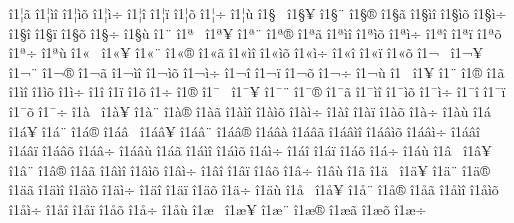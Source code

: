 {^^ee1^^a6^^e3
^^ee1^^a6^^ec^^ee
^^ee1^^a6^^ec^^f5
^^ee1^^a6^^ec^^f7
^^ee1^^a6^^ee
^^ee1^^a6^^ef
^^ee1^^a6^^f5
^^ee1^^a6^^f7
^^ee1^^a6^^f9
^^ee1^^a7^^a0
^^ee1^^a7^^a5
^^ee1^^a7^^a8
^^ee1^^a7^^ae
^^ee1^^a7^^e3
^^ee1^^a7^^ec^^ee
^^ee1^^a7^^ec^^f5
^^ee1^^a7^^ec^^f7
^^ee1^^a7^^ee
^^ee1^^a7^^ef
^^ee1^^a7^^f5
^^ee1^^a7^^f7
^^ee1^^a7^^f9
^^ee1^^a8
^^ee1^^aa^^a0
^^ee1^^aa^^a5
^^ee1^^aa^^a8
^^ee1^^aa^^ae
^^ee1^^aa^^e3
^^ee1^^aa^^ec^^ee
^^ee1^^aa^^ec^^f5
^^ee1^^aa^^ec^^f7
^^ee1^^aa^^ee
^^ee1^^aa^^ef
^^ee1^^aa^^f5
^^ee1^^aa^^f7
^^ee1^^aa^^f9
^^ee1^^ab^^a0
^^ee1^^ab^^a5
^^ee1^^ab^^a8
^^ee1^^ab^^ae
^^ee1^^ab^^e3
^^ee1^^ab^^ec^^ee
^^ee1^^ab^^ec^^f5
^^ee1^^ab^^ec^^f7
^^ee1^^ab^^ee
^^ee1^^ab^^ef
^^ee1^^ab^^f5
^^ee1^^ac^^a0
^^ee1^^ac^^a5
^^ee1^^ac^^a8
^^ee1^^ac^^ae
^^ee1^^ac^^e3
^^ee1^^ac^^ec^^ee
^^ee1^^ac^^ec^^f5
^^ee1^^ac^^ec^^f7
^^ee1^^ac^^ee
^^ee1^^ac^^ef
^^ee1^^ac^^f5
^^ee1^^ac^^f7
^^ee1^^ac^^f9
^^ee1^^ad^^a0
^^ee1^^ad^^a5
^^ee1^^ad^^a8
^^ee1^^ad^^ae
^^ee1^^ad^^e3
^^ee1^^ad^^ec^^ee
^^ee1^^ad^^ec^^f5
^^ee1^^ad^^ec^^f7
^^ee1^^ad^^ee
^^ee1^^ad^^ef
^^ee1^^ad^^f5
^^ee1^^ad^^f7
^^ee1^^ae
^^ee1^^af^^a0
^^ee1^^af^^a5
^^ee1^^af^^a8
^^ee1^^af^^ae
^^ee1^^af^^e3
^^ee1^^af^^ec^^ee
^^ee1^^af^^ec^^f5
^^ee1^^af^^ec^^f7
^^ee1^^af^^ee
^^ee1^^af^^ef
^^ee1^^af^^f5
^^ee1^^af^^f7
^^ee1^^e0^^a0
^^ee1^^e0^^a5
^^ee1^^e0^^a8
^^ee1^^e0^^ae
^^ee1^^e0^^e3
^^ee1^^e0^^ec^^ee
^^ee1^^e0^^ec^^f5
^^ee1^^e0^^ec^^f7
^^ee1^^e0^^ee
^^ee1^^e0^^ef
^^ee1^^e0^^f5
^^ee1^^e0^^f7
^^ee1^^e0^^f9
^^ee1^^e1^^a0
^^ee1^^e1^^a5
^^ee1^^e1^^a8
^^ee1^^e1^^ae
^^ee1^^e1^^e2^^a0
^^ee1^^e1^^e2^^a5
^^ee1^^e1^^e2^^a8
^^ee1^^e1^^e2^^ae
^^ee1^^e1^^e2^^e0
^^ee1^^e1^^e2^^e3
^^ee1^^e1^^e2^^ec^^ee
^^ee1^^e1^^e2^^ec^^f5
^^ee1^^e1^^e2^^ec^^f7
^^ee1^^e1^^e2^^ee
^^ee1^^e1^^e2^^ef
^^ee1^^e1^^e2^^f5
^^ee1^^e1^^e2^^f7
^^ee1^^e1^^e2^^f9
^^ee1^^e1^^e3
^^ee1^^e1^^ec^^ee
^^ee1^^e1^^ec^^f5
^^ee1^^e1^^ec^^f7
^^ee1^^e1^^ee
^^ee1^^e1^^ef
^^ee1^^e1^^f5
^^ee1^^e1^^f7
^^ee1^^e1^^f9
^^ee1^^e2^^a0
^^ee1^^e2^^a5
^^ee1^^e2^^a8
^^ee1^^e2^^ae
^^ee1^^e2^^e3
^^ee1^^e2^^ec^^ee
^^ee1^^e2^^ec^^f5
^^ee1^^e2^^ec^^f7
^^ee1^^e2^^ee
^^ee1^^e2^^ef
^^ee1^^e2^^f5
^^ee1^^e2^^f7
^^ee1^^e2^^f9
^^ee1^^e3
^^ee1^^e4^^a0
^^ee1^^e4^^a5
^^ee1^^e4^^a8
^^ee1^^e4^^ae
^^ee1^^e4^^e3
^^ee1^^e4^^ec^^ee
^^ee1^^e4^^ec^^f5
^^ee1^^e4^^ec^^f7
^^ee1^^e4^^ee
^^ee1^^e4^^ef
^^ee1^^e4^^f5
^^ee1^^e4^^f7
^^ee1^^e4^^f9
^^ee1^^e5^^a0
^^ee1^^e5^^a5
^^ee1^^e5^^a8
^^ee1^^e5^^ae
^^ee1^^e5^^e3
^^ee1^^e5^^ec^^ee
^^ee1^^e5^^ec^^f5
^^ee1^^e5^^ec^^f7
^^ee1^^e5^^ee
^^ee1^^e5^^ef
^^ee1^^e5^^f5
^^ee1^^e5^^f7
^^ee1^^e5^^f9
^^ee1^^e6^^a0
^^ee1^^e6^^a5
^^ee1^^e6^^a8
^^ee1^^e6^^ae
^^ee1^^e6^^e3
^^ee1^^e6^^f5
^^ee1^^e6^^f7
}
